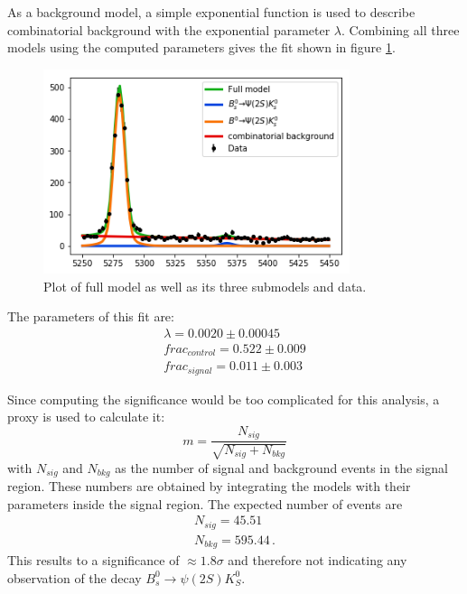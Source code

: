 As a background model, a simple exponential function is used to describe combinatorial background with the exponential parameter $\lambda$.
Combining all three models using the computed parameters gives the fit shown in figure \ref{fig:Fit}.
\begin{figure}[!htb]
  \centering
  \includegraphics[width=0.8\textwidth]{plots/Fit.png}
  \caption{Plot of full model as well as its three submodels and data.}
  \label{fig:Fit}
\end{figure}

The parameters of this fit are:
\begin{align*}
  \lambda = 0.0020 \pm 0.00045 \\
  frac_{control} = 0.522 \pm 0.009 \\
  frac_{signal} = 0.011 \pm 0.003
\end{align*}

Since computing the significance would be too complicated for this analysis, a proxy is used to calculate it:
\begin{equation*}
  m = \frac{N_{sig}}{\sqrt{N_{sig}+N_{bkg}}}
\end{equation*}
with $N_{sig}$ and $N_{bkg}$ as the number of signal and background events in the signal region.
These numbers are obtained by integrating the models with their parameters inside the signal region.
The expected number of events are
\begin{align*}
  N_{sig}= 45.51 \\
  N_{bkg}= 595.44\, .
\end{align*}
This results to a significance of $\approx 1.8 \sigma$ and therefore not indicating any observation of the decay $B^0_s \rightarrow \psi(2S)K^0_S$.



